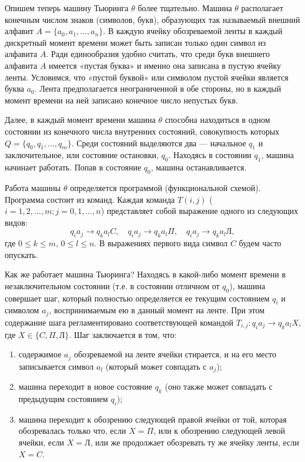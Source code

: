 \documentclass[a4paper,12pt]{article}
\begin{document}
Опишем теперь машину Тьюринга \(\theta\) более тщательно. Машина \(\theta\) располагает конечным числом знаков (символов, букв), образующих так называемый внешний алфавит \(A = \{a_0, a_1, \dots, a_n\}\). В каждую ячейку обозреваемой ленты в каждый дискретный момент времени может быть записан только один символ из алфавита \(A\). Ради единообразия удобно считать, что среди букв внешнего алфавита \(A\) имеется «пустая буква» и именно она записана в пустую ячейку ленты. Условимся, что «пустой буквой» или символом пустой ячейки является буква \(a_0\). Лента предполагается неограниченной в обе стороны, но в каждый момент времени на ней записано конечное число непустых букв.

Далее, в каждый момент времени машина \(\theta\) способна находиться в одном состоянии из конечного числа внутренних состояний, совокупность которых \(Q = \{q_0, q_1, \dots, q_m\}\). Среди состояний выделяются два --- начальное \(q_1\) и заключительное, или состояние остановки, \(q_0\). Находясь в состоянии \(q_1\), машина начинает работать. Попав в состояние \(q_0\), машина останавливается.

Работа машины \(\theta\) определяется программой (функциональной схемой). Программа состоит из команд. Каждая команда \(T(i,j)\) (\(i=1,2,\dots,m; j=0,1,\dots,n\)) представляет собой выражение одного из следующих видов:
\[
q_i a_j \to q_k a_l C, \quad q_i a_j \to q_k a_l \Pi, \quad q_i a_j \to q_k a_l \text{Л},
\]
где \(0 \le k \le m\), \(0 \le l \le n\). В выражениях первого вида символ \(C\) будем часто опускать.

Как же работает машина Тьюринга? Находясь в какой-либо момент времени в незаключительном состоянии (т.е. в состоянии отличном от \(q_0\)), машина совершает шаг, который полностью определяется ее текущим состоянием \(q_i\) и символом \(a_j\), воспринимаемым ею в данный момент на ленте. При этом содержание шага регламентировано соответствующей командой \(T_{i,j}: q_i a_j \to q_k a_l X\), где \(X \in \{C, \Pi, \text{Л}\}\). Шаг заключается в том, что:
\begin{enumerate}
    \item содержимое \(a_j\) обозреваемой на ленте ячейки стирается, и на его место записывается символ \(a_l\) (который может совпадать с \(a_j\));
    \item машина переходит в новое состояние \(q_k\) (оно также может совпадать с предыдущим состоянием \(q_i\));
    \item машина переходит к обозрению следующей правой ячейки от той, которая обозревалась только что, если \(X = \Pi\), или к обозрению следующей левой ячейки, если \(X = \text{Л}\), или же продолжает обозревать ту же ячейку ленты, если \(X = C\).
\end{enumerate}
\end{document}

